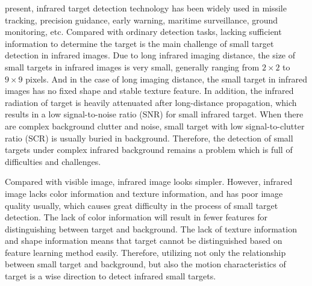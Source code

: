 \documentclass[journal]{IEEEtran}
\begin{document}
 present, infrared target detection technology has been widely used in missile tracking, precision guidance, early warning, maritime surveillance, ground monitoring\cite{luo2015space,dawson2010space,li2014infrared}, etc. Compared with ordinary detection tasks, lacking sufficient information to determine the target is the main challenge of small target detection in infrared images. Due to long infrared imaging distance, the size of small targets in infrared images is very small, generally ranging from $2\times2$ to $9\times9$ pixels\cite{wang2017infrared}. And in the case of long imaging distance, the small target in infrared images has no fixed shape and stable texture feature. In addition, the infrared radiation of target is heavily attenuated after long-distance propagation, which results in a low signal-to-noise ratio (SNR) for small infrared target\cite{li2016novel}. When there are complex background clutter and noise, small target with low signal-to-clutter ratio (SCR) is usually buried in background. Therefore, the detection of small targets under complex infrared background remains a problem which is full of difficulties and challenges.

Compared with visible image, infrared image looks simpler. However, infrared image lacks color information and texture information, and has poor image quality usually, which causes great difficulty in the process of small target detection. The lack of color information will result in fewer features for distinguishing between target and background. The lack of texture information and shape information means that target cannot be distinguished based on feature learning method easily. Therefore, utilizing not only the relationship between small target and background, but also the motion characteristics of target is a wise direction to detect infrared small targets.
\end{document}
